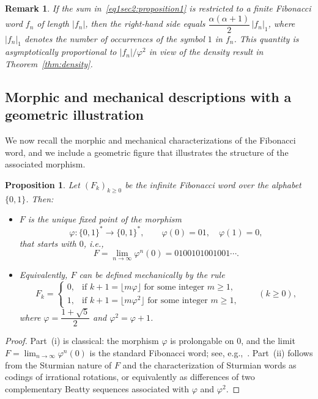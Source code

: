 \documentclass[12pt, a4paper]{article}
\newtheorem{proposition}{Proposition}[section]
\newtheorem{remark}{Remark}
\begin{document}
\begin{remark}
If the sum in~\eqref{eq1sec2:proposition1} is restricted to a finite Fibonacci word $f_n$ of length $|f_n|$, then the right-hand side equals $\dfrac{\alpha(\alpha+1)}{2}\,|f_n|_1$, where $|f_n|_1$ denotes the number of occurrences of the symbol $1$ in $f_n$. This quantity is asymptotically proportional to $|f_n|/\varphi^2$ in view of the density result in Theorem~\ref{thm:density}.
\end{remark}

\subsection{Morphic and mechanical descriptions with a geometric illustration}

We now recall the morphic and mechanical characterizations of the Fibonacci word, and we include a geometric figure that illustrates the structure of the associated morphism.

\begin{proposition}\label{sec2:proposition2}
Let $(F_k)_{k \ge 0}$ be the infinite Fibonacci word over the alphabet $\{0,1\}$. Then:
\begin{itemize}
  \item[(i)] $F$ is the unique fixed point of the morphism
  \[
  \varphi : \{0,1\}^* \to \{0,1\}^*,\qquad
  \varphi(0) = 01,\quad \varphi(1) = 0,
  \]
  that starts with $0$, i.e.,
  \[
  F = \lim_{n \to \infty} \varphi^n(0) = 0100101001001\cdots.
  \]
  \item[(ii)] Equivalently, $F$ can be defined mechanically by the rule
  \[
  F_k =
  \begin{cases}
  0, & \text{if } k+1 = \lfloor m\varphi \rfloor \text{ for some integer } m \ge 1,\\[1mm]
  1, & \text{if } k+1 = \lfloor m\varphi^2 \rfloor \text{ for some integer } m \ge 1,
  \end{cases}
  \qquad (k \ge 0),
  \]
  where $\varphi = \dfrac{1+\sqrt{5}}{2}$ and $\varphi^2 = \varphi + 1$.
\end{itemize}
\end{proposition}

\begin{proof}
Part~(i) is classical: the morphism $\varphi$ is prolongable on $0$, and the limit $F = \lim_{n\to\infty} \varphi^n(0)$ is the standard Fibonacci word; see, e.g.,~\cite{Berstel2007, Berthé2016}. Part~(ii) follows from the Sturmian nature of $F$ and the characterization of Sturmian words as codings of irrational rotations, or equivalently as differences of two complementary Beatty sequences associated with $\varphi$ and $\varphi^2$.
\end{proof}
\end{document}
